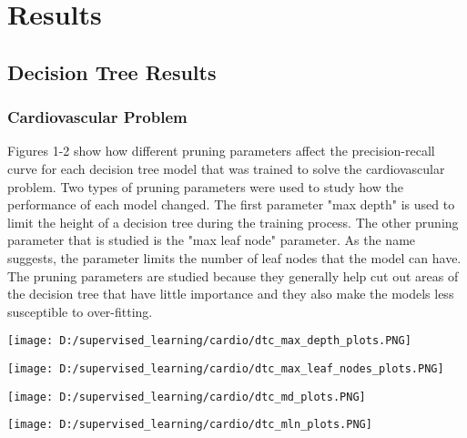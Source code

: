 \documentclass[10pt,journal,compsoc]{IEEEtran}
\begin{document}
\section{Results}
\subsection{Decision Tree Results}
\subsubsection{Cardiovascular Problem}
Figures 1-2 show how different pruning parameters affect the precision-recall curve for each decision tree model that was trained to solve the cardiovascular problem. Two types of pruning parameters were used to study how the performance of each model changed. The first parameter "max depth" is used to limit the height of a decision tree during the training process. The other pruning parameter that is studied is the "max leaf node" parameter. As the name suggests, the parameter limits the number of leaf nodes that the model can have. The pruning parameters are studied because they generally help cut out areas of the decision tree that have little importance and they also make the models less susceptible to over-fitting.   
\begin{center}
	\texttt{[image: D:/supervised\_learning/cardio/dtc\_max\_depth\_plots.PNG]}
\end{center}
\begin{center}
	\texttt{[image: D:/supervised\_learning/cardio/dtc\_max\_leaf\_nodes\_plots.PNG]}
\end{center}
\begin{center}
	\texttt{[image: D:/supervised\_learning/cardio/dtc\_md\_plots.PNG]}
\end{center}
\begin{center}
	\texttt{[image: D:/supervised\_learning/cardio/dtc\_mln\_plots.PNG]}
\end{center}
\end{document}
